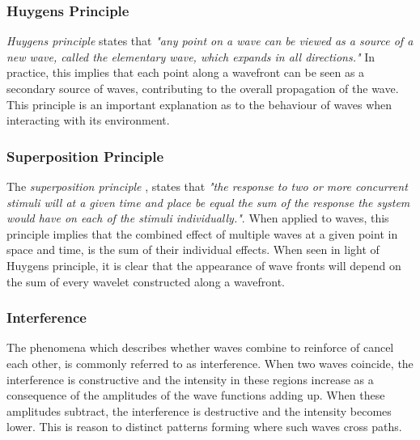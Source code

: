 \documentclass[10pt, nofootinbib, twocolumn]{revtex4-1}
\begin{document}
\subsubsection{Huygens Principle}
\textit{Huygens principle} \cite{oscillations} states that \textit{"any point on a wave can be viewed as a source of a new wave, called the elementary wave, which expands in all directions."} In practice, this implies that each point along a wavefront can be seen as a secondary source of waves, contributing to the overall propagation of the wave. This principle is an important explanation as to the behaviour of waves when interacting with its environment. 

\subsubsection{Superposition Principle}
The \textit{superposition principle} \cite{oscillations}, states that \textit{"the response to two or more concurrent stimuli will at a given time and place be equal the sum of the response the system would have on each of the stimuli individually."}. When applied to waves, this principle implies that the combined effect of multiple waves at a given point in space and time, is the sum of their individual effects. When seen in light of Huygens principle, it is clear that the appearance of wave fronts will depend on the sum of every wavelet constructed along a wavefront. 


\subsubsection{Interference}
The phenomena which describes whether waves combine to reinforce of cancel each other, is commonly referred to as interference. When two waves coincide, the interference is constructive and the intensity in these regions increase as a consequence of the amplitudes of the wave functions adding up. When these amplitudes subtract, the interference is destructive and the intensity becomes lower. This is reason to distinct patterns forming where such waves cross paths. 


\newpage
\end{document}
